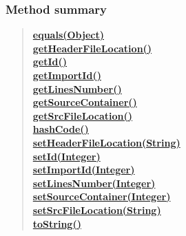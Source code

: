 {{{{{\subsubsection{Method summary}{
\begin{verse}
\hyperlink{it.unisa.sesa.repominer.db.entities.Type.equals(java.lang.Object)}{{\bf equals(Object)}} \\
\hyperlink{it.unisa.sesa.repominer.db.entities.Type.getHeaderFileLocation()}{{\bf getHeaderFileLocation()}} \\
\hyperlink{it.unisa.sesa.repominer.db.entities.Type.getId()}{{\bf getId()}} \\
\hyperlink{it.unisa.sesa.repominer.db.entities.Type.getImportId()}{{\bf getImportId()}} \\
\hyperlink{it.unisa.sesa.repominer.db.entities.Type.getLinesNumber()}{{\bf getLinesNumber()}} \\
\hyperlink{it.unisa.sesa.repominer.db.entities.Type.getSourceContainer()}{{\bf getSourceContainer()}} \\
\hyperlink{it.unisa.sesa.repominer.db.entities.Type.getSrcFileLocation()}{{\bf getSrcFileLocation()}} \\
\hyperlink{it.unisa.sesa.repominer.db.entities.Type.hashCode()}{{\bf hashCode()}} \\
\hyperlink{it.unisa.sesa.repominer.db.entities.Type.setHeaderFileLocation(java.lang.String)}{{\bf setHeaderFileLocation(String)}} \\
\hyperlink{it.unisa.sesa.repominer.db.entities.Type.setId(java.lang.Integer)}{{\bf setId(Integer)}} \\
\hyperlink{it.unisa.sesa.repominer.db.entities.Type.setImportId(java.lang.Integer)}{{\bf setImportId(Integer)}} \\
\hyperlink{it.unisa.sesa.repominer.db.entities.Type.setLinesNumber(java.lang.Integer)}{{\bf setLinesNumber(Integer)}} \\
\hyperlink{it.unisa.sesa.repominer.db.entities.Type.setSourceContainer(java.lang.Integer)}{{\bf setSourceContainer(Integer)}} \\
\hyperlink{it.unisa.sesa.repominer.db.entities.Type.setSrcFileLocation(java.lang.String)}{{\bf setSrcFileLocation(String)}} \\
\hyperlink{it.unisa.sesa.repominer.db.entities.Type.toString()}{{\bf toString()}} \\
\end{verse}
}
}}}}}
